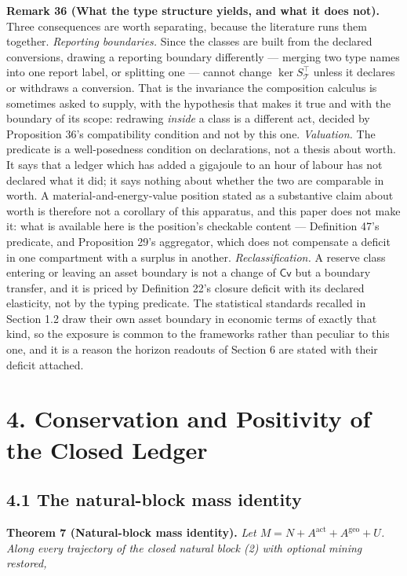 \documentclass[11pt]{article}
\begin{document}
\textbf{Remark 36 (What the type structure yields, and what it does not).} Three consequences are worth separating, because the literature runs them together. \emph{Reporting boundaries.} Since the classes are built from the declared conversions, drawing a reporting boundary differently --- merging two type names into one report label, or splitting one --- cannot change \(\ker S_{\mathcal{T}}^{\top}\) unless it declares or withdraws a conversion. That is the invariance the composition calculus is sometimes asked to supply, with the hypothesis that makes it true and with the boundary of its scope: redrawing \emph{inside} a class is a different act, decided by Proposition 36's compatibility condition and not by this one. \emph{Valuation.} The predicate is a well-posedness condition on declarations, not a thesis about worth. It says that a ledger which has added a gigajoule to an hour of labour has not declared what it did; it says nothing about whether the two are comparable in worth. A material-and-energy-value position stated as a substantive claim about worth is therefore not a corollary of this apparatus, and this paper does not make it: what is available here is the position's checkable content --- Definition 47's predicate, and Proposition 29's aggregator, which does not compensate a deficit in one compartment with a surplus in another. \emph{Reclassification.} A reserve class entering or leaving an asset boundary is not a change of \(\mathsf{Cv}\) but a boundary transfer, and it is priced by Definition 22's closure deficit with its declared elasticity, not by the typing predicate. The statistical standards recalled in Section 1.2 draw their own asset boundary in economic terms of exactly that kind, so the exposure is common to the frameworks rather than peculiar to this one, and it is a reason the horizon readouts of Section 6 are stated with their deficit attached.

\section*{4. Conservation and Positivity of the Closed Ledger}\label{4-conservation-and-positivity-of-the-closed-ledger}

\subsection*{4.1 The natural-block mass identity}\label{41-the-natural-block-mass-identity}

\textbf{Theorem 7 (Natural-block mass identity).} \emph{Let \(M =\allowbreak{} N +\allowbreak{} A^{\mathrm{act}} +\allowbreak{} A^{\mathrm{geo}} +\allowbreak{} U\). Along every trajectory of the closed natural block (2) with optional mining restored,} 
\end{document}
